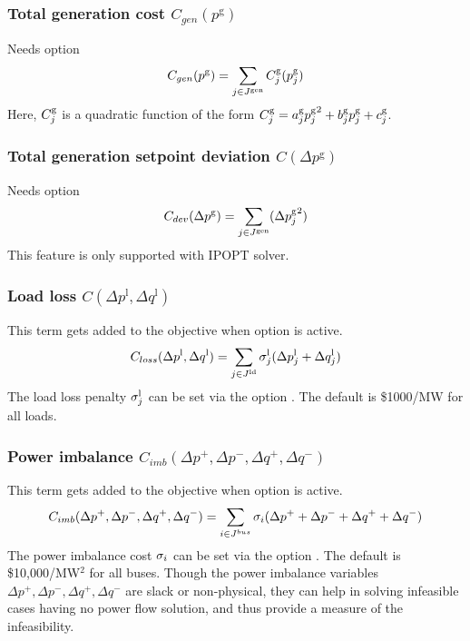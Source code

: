 \subsubsection{Total generation cost $C_{gen}(p^{\text{g}})$}
Needs option \opflowoption{\opflowobjective}{\mingencost}
\begin{equation}
C_{gen}(p^{\text{g}}) = \sum_{j \in J^\text{gen}} C^\text{g}_j(p^\text{g}_j)
\label{eq:opf_obj_mingencost}
\end{equation}
Here, $C^\text{g}_j$ is a quadratic function of the form $C^\text{g}_j = a^\text{g}_j{p^\text{g}_j}^2 + b^\text{g}_jp^\text{g}_j + c^\text{g}_j$.

\subsubsection{Total generation setpoint deviation $C(\Delta p^{\text{g}})$}
Needs option \opflowoption{\opflowobjective}{\mingensetpointdeviation}
\begin{equation}
C_{dev}(\Delta p^{\text{g}}) = \sum_{j \in J^\text{gen}} ({\Delta{p}^\text{g}_j}^2)
\label{eq:opf_obj_mingensetpointdev}
\end{equation}
This feature is only supported with IPOPT solver.

\subsubsection{Load loss $C(\Delta p^{\text{l}},\Delta q^{\text{l}})$}
This term gets added to the objective when  \option{\opflowincludeloadloss} option is active. 
\begin{equation}
C_{loss}(\Delta p^{\text{l}},\Delta q^{\text{l}}) =  \sum_{j \in J^\text{ld}} \sigma^\text{l}_j({\Delta{p}^{\text{l}}_j} + {\Delta{q}^{\text{l}}_j})
\label{eq:opf_obj_minloadloss}
\end{equation}
The load loss penalty $\sigma^\text{l}_j$ can be set via the option
. The default is \$1000/MW for all loads.

\subsubsection{Power imbalance $C_{imb}(\Delta p^{+},\Delta p^{-},\Delta q^{+},\Delta q^{-})$}
This term gets added to the objective when   option is active. 
\begin{equation}
C_{imb}(\Delta p^{+},\Delta p^{-},\Delta q^{+},\Delta q^{-}) =  \sum_{i \in J^{bus}} \sigma_i(\Delta p^{+} + \Delta p^{-} + \Delta q^{+} + \Delta q^{-})
\label{eq:opf_obj_minpowerimbalance}
\end{equation}
The power imbalance cost $\sigma_i$ can be set via the option
. The default is \$10,000/MW$^2$ for all buses. Though the power imbalance variables $\Delta p^{+},\Delta p^{-},\Delta q^{+},\Delta q^{-}$ are slack or non-physical, they can help in solving infeasible cases having no power flow solution, and thus provide a measure of the infeasibility. 

